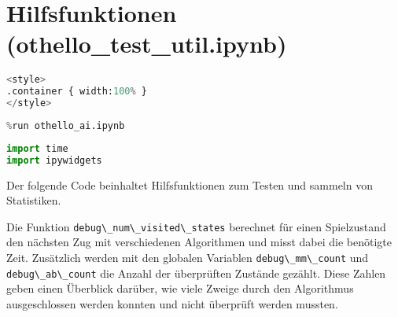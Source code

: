\hypertarget{hilfsfunktionen-othello_test_util.ipynb}{%
\section{Hilfsfunktionen
(othello\_test\_util.ipynb)}\label{hilfsfunktionen-othello_test_util.ipynb}}

\label{sec:util}

\begin{lstlisting}[language=Python]
%%HTML
<style>
.container { width:100% }
</style>
\end{lstlisting}

\begin{lstlisting}[language=Python]
%run othello_game.ipynb
%run othello_ai.ipynb
\end{lstlisting}

\begin{lstlisting}[language=Python]
import time
import ipywidgets
\end{lstlisting}

Der folgende Code beinhaltet Hilfsfunktionen zum Testen und sammeln von
Statistiken.

Die Funktion \passthrough{\lstinline!debug\_num\_visited\_states!}
berechnet für einen Spielzustand den nächsten Zug mit verschiedenen
Algorithmen und misst dabei die benötigte Zeit. Zusätzlich werden mit
den globalen Variablen \passthrough{\lstinline!debug\_mm\_count!} und
\passthrough{\lstinline!debug\_ab\_count!} die Anzahl der überprüften
Zustände gezählt. Diese Zahlen geben einen Überblick darüber, wie viele
Zweige durch den Algorithmus ausgeschlossen werden konnten und nicht
überprüft werden mussten.

